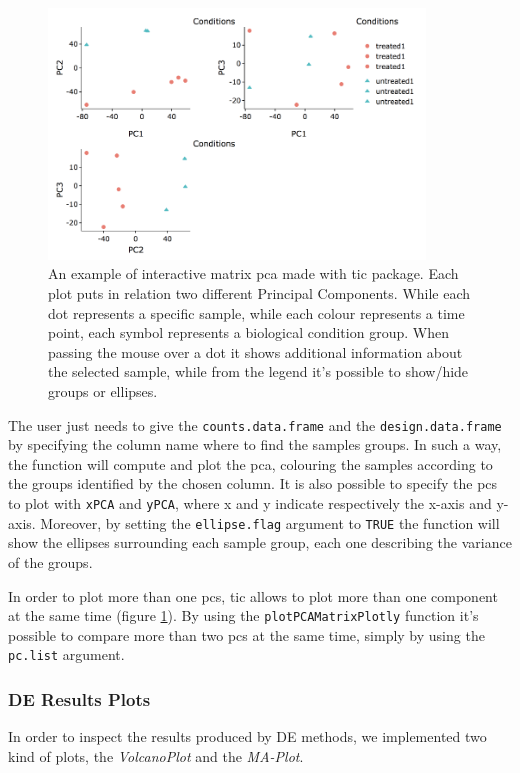 \begin{figure}[H]
\centering
\includegraphics[width=10cm, keepaspectratio]{img/ticorser/pcas.png}
\caption[\gls{tic} pca]{An example of interactive matrix \gls{pca} made with \gls{tic} package. Each plot puts in relation two different Principal Components. While each dot represents a specific sample, while each colour represents a time point, each symbol represents a biological condition group. When passing the mouse over a dot it shows additional information about the selected sample, while from the legend it's possible to show/hide groups or ellipses.}
\label{fig:ticorserpcas}
\end{figure}

The user just needs to give the \lstinline!counts.data.frame! and the \lstinline!design.data.frame! by specifying the column name where to find the samples groups.
In such a way, the function will compute and plot the \gls{pca}, colouring the samples according to the groups identified by the chosen column.
It is also possible to specify the \glspl{pc} to plot with \lstinline!xPCA! and \lstinline!yPCA!, where x and y indicate respectively the x-axis and y-axis.
Moreover, by setting the \lstinline!ellipse.flag! argument to \lstinline!TRUE!  the function will show the ellipses surrounding each sample group, each one describing the variance of the groups.

In order to plot more than one \glspl{pc}, \gls{tic} allows to plot more than one component at the same time (figure \ref{fig:ticorserpcas}).
By using the \lstinline!plotPCAMatrixPlotly! function it's possible to compare more than two \glspl{pc} at the same time, simply by using the \lstinline!pc.list! argument.




\subsubsection{DE Results Plots}
In order to inspect the results produced by DE methods, we implemented two kind of plots, the \textit{VolcanoPlot} and the \textit{MA-Plot}.

